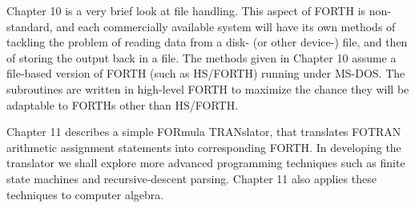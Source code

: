 Chapter 10 is a very brief look at file handling. This aspect of FORTH is non-standard, and each commercially available system will have its own methods of tackling the problem of reading data from a disk- (or other device-) file, and then of storing the output back in a file. The methods given in Chapter 10 assume a file-based version of FORTH (such as HS/FORTH) running under MS-DOS. The subroutines are written in high-level FORTH to maximize the chance they will be adaptable to FORTHs other than HS/FORTH.

Chapter 11 describes a simple FORmula TRANslator, that translates FOTRAN arithmetic assignment statements into corresponding FORTH. In developing the translator we shall explore more advanced programming techniques such as finite state machines and recursive-descent parsing. Chapter 11 also applies these techniques to computer algebra.